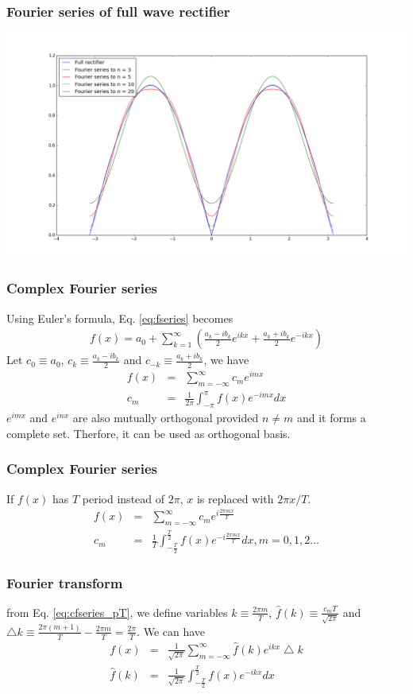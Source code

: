 \documentclass{beamer}
\begin{document}
\begin{frame}
\frametitle{Fourier series of full wave rectifier}
\includegraphics[scale=0.3]{fullrectifier.png}
\end{frame}
\begin{frame}
\frametitle{Complex Fourier series}
Using Euler's formula, Eq. \ref{eq:fseries} becomes 
\begin{eqnarray}
f(x)=a_0 + \sum_{k=1}^{\infty} \left(\frac{a_k - ib_k}{2} e^{ikx} + \frac{a_k + ib_k}{2}e^{-ikx}\right) \nonumber
\end{eqnarray}
Let $c_0 \equiv a_0$, $c_k \equiv \frac{a_k - ib_k}{2}$ and $c_{-k} \equiv \frac{a_k + ib_k}{2}$, we have
\begin{eqnarray}
f(x)&=&\sum_{m=-\infty}^{\infty} c_m e^{imx} \nonumber \\
c_m&=&\frac{1}{2\pi}\int_{-\pi}^{\pi} f(x) e^{-imx} dx
\label{eq:cfseries}
\end{eqnarray}
$e^{imx}$ and $e^{inx}$ are also mutually orthogonal provided $n \neq m$ and it forms a complete set. Therfore, it can be used as orthogonal basis.\newline
\end{frame}
\begin{frame}
\frametitle{Complex Fourier series}
If $f(x)$ has $T$ period instead of $2\pi$, $x$ is replaced with $2\pi x /T$.
\begin{eqnarray}
f(x)&=&\sum_{m=-\infty}^{\infty} c_m e^{i\frac{2\pi mx}{T}} \nonumber \\
c_m&=&\frac{1}{T}\int_{-\frac{T}{2}}^{\frac{T}{2}} f(x) e^{-i\frac{2\pi mx}{T}} dx, m = 0,1,2...
\label{eq:cfseries_pT}
\end{eqnarray}
\end{frame}
\begin{frame}
\frametitle{Fourier transform}
from Eq. \ref{eq:cfseries_pT}, we define variables $k \equiv \frac{2\pi m}{T}$, $\hat{f}(k) \equiv\frac{c_mT}{\sqrt{2\pi}}$ and $ \bigtriangleup{k} \equiv \frac{2\pi (m+1)}{T} - \frac{2\pi m}{T} = \frac{2\pi}{T}$. \newline We can have
\begin{eqnarray}
f(x)&=&\frac{1}{\sqrt{2\pi}}\sum_{m=-\infty}^{\infty} \hat{f}(k) e^{ikx} \bigtriangleup{k} \nonumber \\
\hat{f}(k)&=&\frac{1}{\sqrt{2\pi}}\int_{-\frac{T}{2}}^{\frac{T}{2}} f(x) e^{-ikx}dx\nonumber
\end{eqnarray}
\end{frame}
\end{document}

